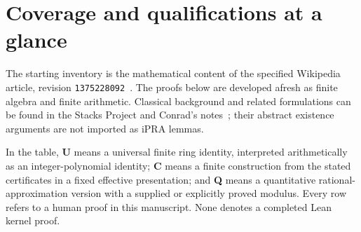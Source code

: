 \section*{Coverage and qualifications at a glance}

The starting inventory is the mathematical content of the specified
Wikipedia article, revision \texttt{1375228092}~\cite{wikipedia}.
The proofs below are developed afresh as finite algebra and finite
arithmetic. Classical background and related formulations can be found
in the Stacks Project and Conrad's notes~\cite{stacks,conrad}; their
abstract existence arguments are not imported as iPRA lemmas.

In the table, \textbf{U} means a universal finite ring identity, interpreted
arithmetically as an integer-polynomial identity; \textbf{C} means a
finite construction from the stated certificates in a fixed effective
presentation; and \textbf{Q} means a quantitative rational-approximation
version with a supplied or explicitly proved modulus. Every row refers
to a human proof in this manuscript. None denotes a completed Lean
kernel proof.

